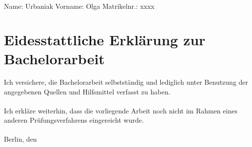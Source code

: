 \pagestyle{fancy}
\fancyhf{} %
Name: Urbaniak \hfill Vorname: Olga \hfill Matrikelnr.: xxxx
\section*{Eidesstattliche Erklärung zur Bachelorarbeit}
Ich versichere, die Bachelorarbeit selbstständig und lediglich unter Benutzung der angegebenen Quellen und Hilfsmittel verfasst zu haben.
\\\\
Ich erkläre weiterhin, dass die vorliegende Arbeit noch nicht im Rahmen eines anderen Prüfungsverfahrens eingereicht wurde.
\\\\
Berlin, den \thesisDate
\clearpage
\pagestyle{fancy}
\fancyhf{} %
